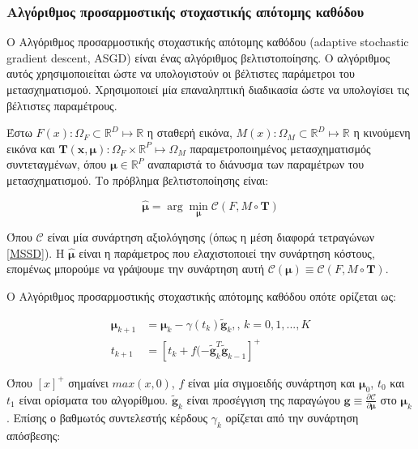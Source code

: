 \documentclass[a4paper,12pt]{article}
\newcommand{\argminUnder}{\arg\!\min}
\newcommand{\R}{\mathbb{R}}
\begin{document}
\subsubsection{Αλγόριθμος προσαρμοστικής στοχαστικής απότομης καθόδου}
\label{reg:asgd:1}

Ο Αλγόριθμος προσαρμοστικής στοχαστικής απότομης καθόδου (adaptive stochastic
gradient descent, ASGD) \cite{ASGD:1} είναι ένας αλγόριθμος βελτιστοποίησης. Ο
αλγόριθμος αυτός χρησιμοποιείται ώστε να υπολογιστούν οι βέλτιστες παράμετροι
του μετασχηματισμού. Χρησιμοποιεί μία επαναληπτική διαδικασία ώστε να υπολογίσει
τις βέλτιστες παραμέτρους.

Έστω $F(x): \Omega_F \subset \R^D \mapsto \R$ η σταθερή εικόνα, $M(x): \Omega_M
\subset \R^D \mapsto \R$ η κινούμενη εικόνα και $\bm{T(x,\mu)}: \Omega_F \times
\R^P \mapsto \Omega_M$ παραμετροποιημένος μετασχηματισμός συντεταγμένων, όπου
$\bm{\mu} \in \R^P$ αναπαριστά το διάνυσμα των παραμέτρων του μετασχηματισμού.
Το πρόβλημα βελτιστοποίησης είναι:


\begin{equation*}
    \hat{\bm{\mu}} = \argminUnder_{\bm{\mu}} \mathcal{C} (F,M\circ \bm{T})
\end{equation*}

Όπου $\mathcal{C}$ είναι μία συνάρτηση αξιολόγησης (όπως η μέση διαφορά
τετραγώνων \ref{MSSD}). Η $\hat{\bm{\mu}}$ είναι η παράμετρος που ελαχιστοποιεί
την συνάρτηση κόστους, επομένως μπορούμε να γράψουμε την συνάρτηση αυτή
$\mathcal{C} (\bm{\mu}) \equiv \mathcal{C} (F,M\circ \bm{T})$.

Ο Αλγόριθμος προσαρμοστικής στοχαστικής απότομης καθόδου οπότε ορίζεται ως:

\begin{equation*}
\begin{split}
    \bm{\mu}_{k+1} &= \bm{\mu}_{k} - \gamma(t_k) \widetilde{\bm{g}}_{k},
    \text{,  }
    k=0,1,...,K
    \\
    t_{k+1} &= [t_k + f(-\widetilde{\bm{g}}_{k}^T \widetilde{\bm{g}}_{k-1}]^+
\end{split}
\end{equation*}

Όπου $[x]^+$ σημαίνει $max(x,0)$, $f$ είναι μία σιγμοειδής συνάρτηση και
$\bm{\mu}_{0}$, $t_0$ και $t_1$ είναι ορίσματα του αλγορίθμου.
$\widetilde{\bm{g}}_{k}$ είναι προσέγγιση της παραγώγου $\bm{g} \equiv \frac
{\partial \mathcal{C}} {\partial \bm{\mu}}$ στο $\bm{\mu}_k$. Επίσης ο βαθμωτός
συντελεστής κέρδους $\gamma_k$ ορίζεται από την συνάρτηση απόσβεσης: 
\end{document}
